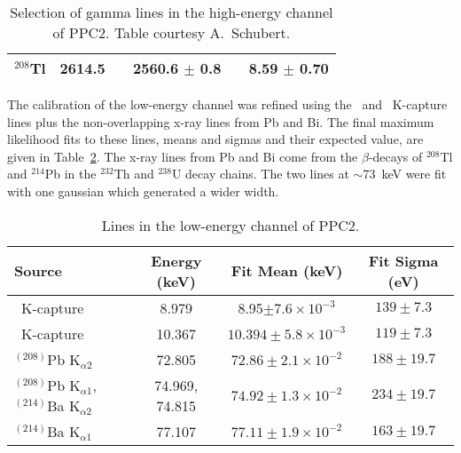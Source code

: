 \begin{table}
\begin{tabular}{  c | r | r | c  }
					$^{208}$Tl    & 2614.5    ~ & 2560.6     ${\pm}$ 0.8       ~ & 8.59       ${\pm}$ 0.70       \\
					\hline
					\end{tabular}

				
					\caption[Selection of gamma lines in the high-energy channel of PPC2]
					{Selection of gamma lines in the high-energy channel of PPC2.  Table courtesy A.~Schubert.}
					\label{tab:PPC2HighEnergyGammaLines}
				\end{table}
	
	The calibration of the low-energy channel was refined using the \gersixeight~and \znsixfive~K-capture lines plus the non-overlapping x-ray lines from Pb and Bi.  The final maximum likelihood fits to these lines, means and sigmas and their expected value, are given in Table~\ref{tab:PPCLowEnergyLines}.  The x-ray lines from Pb and Bi come from the $\beta$-decays of $^{208}$Tl and $^{214}$Pb in the $^{232}$Th and $^{238}$U decay chains.  The two lines at $\sim$73~keV were fit with one gaussian which generated a wider width.  
				\begin{table}
					\begin{tabular}{l|c|c|c}
						Source & Energy (keV) & Fit Mean (keV) & Fit Sigma (eV) \\
						\hline						
						\znsixfive~K-capture & 8.979 & 8.95$\pm7.6\times10^{-3}$ & $139 \pm 7.3$ \\
						\hline
						\gersixeight~K-capture & 10.367 & $10.394\pm5.8\times10^{-3}$ & $119 \pm 7.3$ \\
						\hline
						$^{(208)}$Pb K$_{\alpha2}$ & 72.805 & $72.86\pm2.1\times10^{-2}$ & $188 \pm 19.7$ \\
						\hline
						$^{(208)}$Pb K$_{\alpha1}$, $^{(214)}$Ba K$_{\alpha2}$ & 74.969, 74.815 & $74.92\pm1.3\times10^{-2}$ & $234 \pm 19.7$ \\
						\hline
						$^{(214)}$Ba K$_{\alpha1}$ & 77.107& $77.11\pm1.9\times10^{-2}$ & $163 \pm 19.7$ \\				
						\hline																
					\end{tabular}
					\caption[Lines in the low-energy channel of PPC2]
					{Lines in the low-energy channel of PPC2.}
					\label{tab:PPCLowEnergyLines}
				\end{table}

